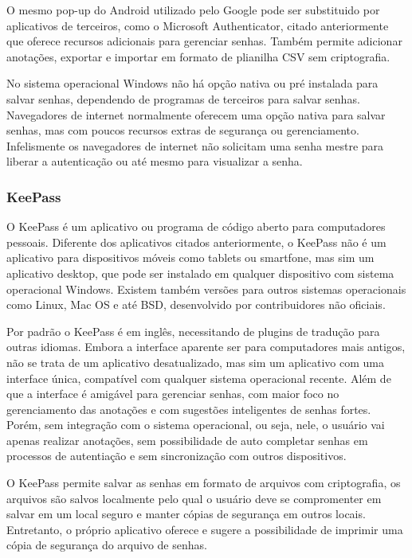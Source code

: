 \documentclass[12pt]{article}
\begin{document}
O mesmo pop-up do Android utilizado pelo Google pode ser substituido por
aplicativos de terceiros, como o Microsoft Authenticator, citado anteriormente
que oferece recursos adicionais para gerenciar senhas.
Também permite adicionar anotações, exportar e importar em formato de plianilha
CSV sem criptografia.

No sistema operacional Windows não há opção nativa ou pré instalada para
salvar senhas, dependendo de programas de terceiros para salvar senhas.
Navegadores de internet normalmente oferecem uma opção nativa para salvar senhas,
mas com poucos recursos extras de segurança ou gerenciamento.
Infelismente os navegadores de internet não solicitam uma senha mestre para liberar
a autenticação ou até mesmo para visualizar a senha.

\subsubsection{KeePass}

O KeePass é um aplicativo ou programa de código aberto para computadores pessoais.
Diferente dos aplicativos citados anteriormente, o KeePass não é um aplicativo
para dispositivos móveis como tablets ou smartfone, mas sim um aplicativo desktop,
que pode ser instalado em qualquer dispositivo com sistema operacional Windows.
Existem também versões para outros sistemas operacionais como Linux, Mac OS e até
BSD, desenvolvido por contribuidores não oficiais.

Por padrão o KeePass é em inglês, necessitando de plugins de tradução para outras
idiomas.
Embora a interface aparente ser para computadores mais antigos, não se trata de um
aplicativo desatualizado, mas sim um aplicativo com uma interface única, compatível
com qualquer sistema operacional recente.
Além de que a interface é amigável para gerenciar senhas, com maior foco no gerenciamento
das anotações e com sugestões inteligentes de senhas fortes.
Porém, sem integração com o sistema operacional, ou seja, nele, o usuário vai apenas
realizar anotações, sem possibilidade de auto completar senhas em processos de autentiação
e sem sincronização com outros dispositivos.

O KeePass permite salvar as senhas em formato de arquivos com criptografia, os arquivos
são salvos localmente pelo qual o usuário deve se compromenter em salvar em um local
seguro e manter cópias de segurança em outros locais.
Entretanto, o próprio aplicativo oferece e sugere a possibilidade de imprimir uma cópia
de segurança do arquivo de senhas.
\end{document}
